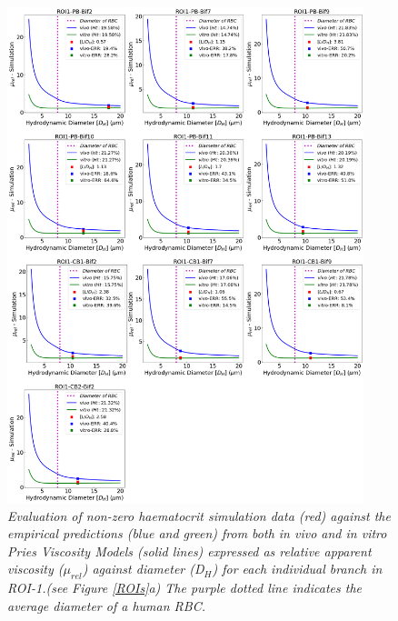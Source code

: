 \begin{figure}[H]
\centering
\includegraphics[width=0.925\textwidth]{images/DeviationsViscosity-ROI1.png}
\caption{\textit{Evaluation of non-zero haematocrit simulation data (red) against the empirical predictions (blue and green) from both in vivo and in vitro Pries Viscosity Models (solid lines) expressed as relative apparent viscosity ($\mu_{rel}$) against diameter (D$_{H}$) for each individual branch in ROI-1.(see Figure \ref{ROIs}a) The purple dotted line indicates the average diameter of a human RBC.} \label{DeviationsViscosity-ROI1}}
\end{figure}


